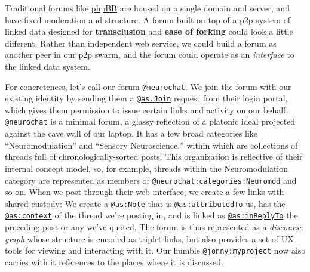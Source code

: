 \documentclass[10pt]{article}
\begin{document}
\begin{multicols}{2}
Traditional forums like \href{https://www.phpbb.com/}{phpBB} are housed
on a single domain and server, and have fixed moderation and structure.
A forum built on top of a p2p system of linked data designed for
\textbf{transclusion} and \textbf{ease of forking} could look a little
different. Rather than independent web service, we could build a forum
as another peer in our p2p swarm, and the forum could operate as an
\emph{interface} to the linked data system.

For concreteness, let's call our forum \texttt{@neurochat}. We join the
forum with our existing identity by sending them a
\href{https://www.w3.org/TR/activitystreams-vocabulary/\#dfn-join}{\texttt{@as.Join}}
request from their login portal, which gives them permission to issue
certain links and activity on our behalf. \texttt{@neurochat} is a
minimal forum, a glassy reflection of a platonic ideal projected against
the cave wall of our laptop. It has a few broad categories like
``Neuromodulation'' and ``Sensory Neuroscience,'' within which are
collections of threads full of chronologically-sorted posts. This
organization is reflective of their internal concept model, so, for
example, threads within the Neuromodulation category are represented as
members of \texttt{@neurochat:categories:Neuromod} and so on. When we
post through their web interface, we create a few links with shared
custody: We create a
\href{https://www.w3.org/TR/activitystreams-vocabulary/\#dfn-note}{\texttt{@as:Note}}
that is
\href{https://www.w3.org/TR/activitystreams-vocabulary/\#dfn-attributedto}{\texttt{@as:attributedTo}}
us, has the
\href{https://www.w3.org/TR/activitystreams-vocabulary/\#dfn-context}{\texttt{@as:context}}
of the thread we're posting in, and is linked as
\href{https://www.w3.org/TR/activitystreams-vocabulary/\#dfn-inreplyto}{\texttt{@as:inReplyTo}}
the preceding post or any we've quoted. The forum is thus represented as
a \emph{discourse graph} whose structure is encoded as triplet links,
but also provides a set of UX tools for viewing and interacting with it.
Our humble \texttt{@jonny:myproject} now also carries with it references
to the places where it is discussed.


\end{multicols}
\end{document}
